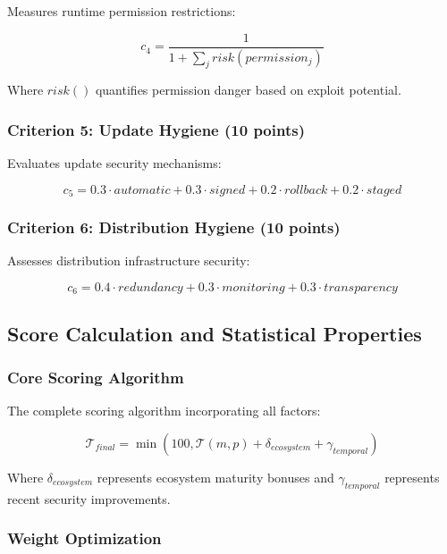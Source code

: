 \documentclass[11pt,a4paper]{article}
\begin{document}
Measures runtime permission restrictions:

\begin{equation}
c_4 = \frac{1}{1 + \sum_{j} risk(permission_j)}
\end{equation}

Where $risk()$ quantifies permission danger based on exploit potential.

\subsubsection{Criterion 5: Update Hygiene (10 points)}

Evaluates update security mechanisms:

\begin{equation}
c_5 = 0.3 \cdot automatic + 0.3 \cdot signed + 0.2 \cdot rollback + 0.2 \cdot staged
\end{equation}

\subsubsection{Criterion 6: Distribution Hygiene (10 points)}

Assesses distribution infrastructure security:

\begin{equation}
c_6 = 0.4 \cdot redundancy + 0.3 \cdot monitoring + 0.3 \cdot transparency
\end{equation}

\subsection{Score Calculation and Statistical Properties}

\subsubsection{Core Scoring Algorithm}

The complete scoring algorithm incorporating all factors:

\begin{equation}
\mathcal{T}_{final} = \min(100, \mathcal{T}(m,p) + \delta_{ecosystem} + \gamma_{temporal})
\end{equation}

Where $\delta_{ecosystem}$ represents ecosystem maturity bonuses and $\gamma_{temporal}$ represents recent security improvements.

\subsubsection{Weight Optimization}
\end{document}
